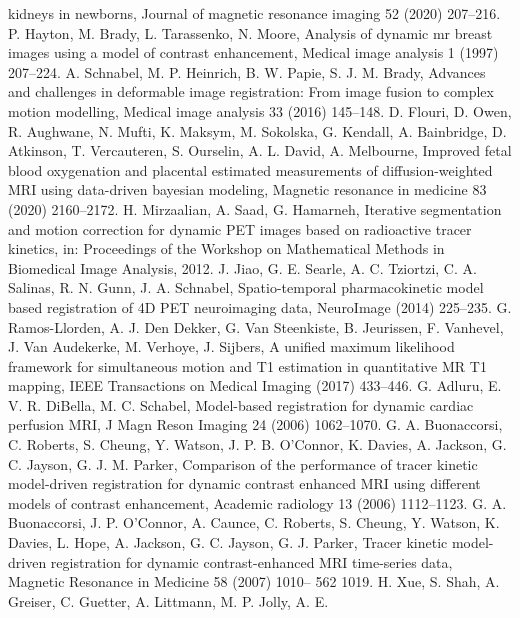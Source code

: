 \documentclass[num-refs]{wiley-article}
\begin{document}
\begin{thebibliography}{55}
	kidneys in newborns, Journal of magnetic resonance imaging  52 (2020) 207--216.
	P. Hayton, M. Brady, L. Tarassenko, N. Moore, Analysis of dynamic mr
	breast images using a model of contrast enhancement, Medical image analysis 1 (1997) 207--224.
	A. Schnabel, M. P. Heinrich, B. W. Papie, S. J. M. Brady, Advances and
	challenges in deformable image registration: From image fusion to complex motion modelling, Medical image analysis  33 (2016) 145--148.
	D. Flouri, D. Owen, R. Aughwane, N. Mufti, K. Maksym, M. Sokolska,
	G. Kendall, A. Bainbridge, D. Atkinson, T. Vercauteren, S. Ourselin, A. L.
	David, A. Melbourne, Improved fetal blood oxygenation and placental estimated measurements of diffusion-weighted MRI using data-driven bayesian modeling, Magnetic resonance in medicine 83 (2020) 2160--2172.
	H. Mirzaalian, A. Saad, G. Hamarneh, Iterative segmentation and motion
	correction for dynamic PET images based on radioactive tracer kinetics, in: Proceedings of the Workshop on Mathematical Methods in Biomedical
	Image Analysis, 2012.
	J. Jiao, G. E. Searle, A. C. Tziortzi, C. A. Salinas, R. N. Gunn, J. A.
	Schnabel, Spatio-temporal pharmacokinetic model based registration of 4D PET neuroimaging data, NeuroImage (2014) 225--235.
	G. Ramos-Llorden, A. J. Den Dekker, G. Van Steenkiste, B. Jeurissen, F. Vanhevel, J. Van Audekerke, M. Verhoye, J. Sijbers, A unified maximum
	likelihood framework for simultaneous motion and T1 estimation in quantitative MR T1 mapping, IEEE Transactions on Medical Imaging (2017) 433--446.
	G. Adluru, E. V. R. DiBella, M. C. Schabel, Model-based registration for
	dynamic cardiac perfusion MRI, J Magn Reson Imaging 24 (2006) 1062--1070.
	G. A. Buonaccorsi, C. Roberts, S. Cheung, Y. Watson, J. P. B. O’Connor,
	K. Davies, A. Jackson, G. C. Jayson, G. J. M. Parker,	Comparison of the performance of tracer kinetic model-driven registration for dynamic
	contrast enhanced MRI using different models of contrast enhancement, Academic radiology 13 (2006) 1112--1123.
	G. A. Buonaccorsi, J. P. O’Connor, A. Caunce, C. Roberts, S. Cheung,
	Y. Watson, K. Davies, L. Hope, A. Jackson, G. C. Jayson, G. J. Parker,
	Tracer kinetic model-driven registration for dynamic contrast-enhanced
	MRI time-series data, Magnetic Resonance in Medicine 58 (2007) 1010-- 562 1019.
	H. Xue, S. Shah, A. Greiser, C. Guetter, A. Littmann, M. P. Jolly, A. E.

\end{thebibliography}
\end{document}
